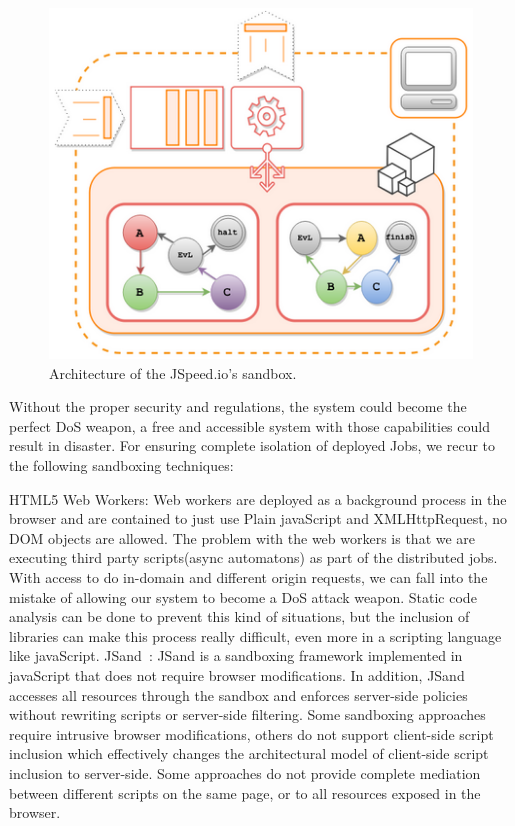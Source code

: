 \documentclass[10pt,reprint]{socc14}
\begin{document}

\begin{figure}[h]	
	\centering
	\includegraphics[scale=0.7]{sandboxDiagram}
	\caption{Architecture of the JSpeed.io’s sandbox.}
\end{figure}


Without the proper security and regulations, the system could become the perfect DoS weapon, a free and accessible system with those capabilities could result in disaster. For ensuring complete isolation of deployed Jobs, we recur to the following sandboxing techniques:

HTML5 Web Workers: Web workers are deployed as a background process in the browser and are contained to just use Plain javaScript and XMLHttpRequest, no DOM objects are allowed. The problem with the web workers is that we are executing third party scripts(async automatons) as part of the distributed jobs. With access to do in-domain and different origin requests, we can fall into the mistake of allowing our system to become a DoS attack weapon. Static code analysis can be done to prevent this kind of situations, but the inclusion of libraries can make this process really difficult, even more in a scripting language like javaScript.
JSand~\cite{Agten2012}: JSand is a sandboxing framework implemented in javaScript that does not require browser modifications. In addition, JSand accesses all resources through the sandbox and enforces server-side policies without rewriting scripts or server-side filtering. Some sandboxing approaches require intrusive browser modifications, others do not support client-side script inclusion which effectively changes the architectural model of client-side script inclusion to server-side. Some approaches do not provide complete mediation between different scripts on the same page, or to all resources exposed in the browser.
\end{document}
